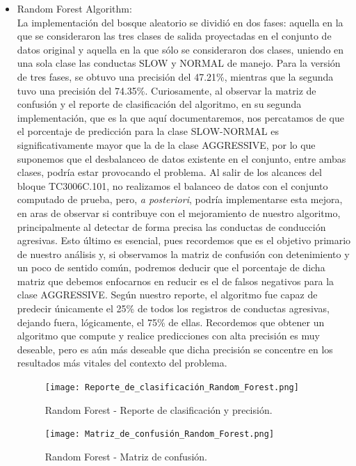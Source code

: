 \documentclass[runningheads]{llncs}
\begin{document}
\begin{itemize}
    \newpage
    
    \item Random Forest Algorithm:\\
    La implementación del bosque aleatorio se dividió en dos fases: aquella en la que se consideraron las tres clases de salida proyectadas en el conjunto de datos original y aquella en la que sólo se consideraron dos clases, uniendo en una sola clase las conductas SLOW y NORMAL de manejo. Para la versión de tres fases, se obtuvo una precisión del 47.21\%, mientras que la segunda tuvo una precisión del 74.35\%. Curiosamente, al observar la matriz de confusión y el reporte de clasificación del algoritmo, en su segunda implementación, que es la que aquí documentaremos, nos percatamos de que el porcentaje de predicción para la clase SLOW-NORMAL es significativamente mayor que la de la clase AGGRESSIVE, por lo que suponemos que el desbalanceo de datos existente en el conjunto, entre ambas clases, podría estar provocando el problema. Al salir de los alcances del bloque TC3006C.101, no realizamos el balanceo de datos con el conjunto computado de prueba, pero, \textit{a posteriori}, podría implementarse esta mejora, en aras de observar si contribuye con el mejoramiento de nuestro algoritmo, principalmente al detectar de forma precisa las conductas de conducción agresivas. Esto último es esencial, pues recordemos que es el objetivo primario de nuestro análisis y, si observamos la matriz de confusión con detenimiento y un poco de sentido común, podremos deducir que el porcentaje de dicha matriz que debemos enfocarnos en reducir es el de falsos negativos para la clase AGGRESSIVE. Según nuestro reporte, el algoritmo fue capaz de predecir únicamente el 25\% de todos los registros de conductas agresivas, dejando fuera, lógicamente, el 75\% de ellas. Recordemos que obtener un algoritmo que compute y realice predicciones con alta precisión es muy deseable, pero es aún más deseable que dicha precisión se concentre en los resultados más vitales del contexto del problema.
    \\
    \begin{figure}
        \centering
        \texttt{[image: Reporte\_de\_clasificación\_Random\_Forest.png]}
        \caption{Random Forest - Reporte de clasificación y precisión.}
        \label{fig:comand}%
    \end{figure}
    
    \begin{figure}
        \centering
        \texttt{[image: Matriz\_de\_confusión\_Random\_Forest.png]}
        \caption{Random Forest - Matriz de confusión.}
        \label{fig:comand}%
    \end{figure}
    

\end{itemize}
\end{document}

